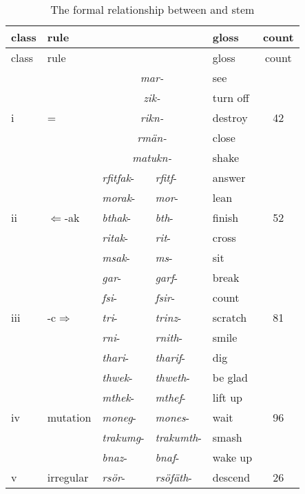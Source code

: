 \begin{table}
\caption{The formal relationship between \Ext{} and \Rs{} stem}
\begin{tabularx}{\textwidth}{lllllc}
\label{frbearr}\\
	\lsptoprule
	{class}&{rule} &\Ext{} &\Rs{} &{gloss} &{count}\\\midrule
	{class}&{rule} &\Ext{} &\Rs{} &{gloss} &{count}\\\midrule
	\multirow{5}{*}{{i}}	&\multirow{5}{*}{\Ext{}=\Rs{}} &\multicolumn{2}{c}{\emph{mar-}} &see &\multirow{5}{*}{\textsc{42}}\\
	&&\multicolumn{2}{c}{\emph{zik-}} &turn off &\\
	&&\multicolumn{2}{c}{\emph{rikn-}} &destroy &\\
	&&\multicolumn{2}{c}{\emph{rmän-}} &close &\\
	&&\multicolumn{2}{c}{\emph{matukn-}} &shake &\\\midrule
	\multirow{5}{*}{{ii}} &\multirow{5}{*}{\Ext{}$\Leftarrow$\Rs-ak} &\emph{rfitfak}- &\emph{rfitf}- &answer &\multirow{5}{*}{\textsc{52}}\\
	&&\emph{morak}- &\emph{mor}- &lean &\\
	&&\emph{bthak}- &\emph{bth}- &finish &\\
	&&\emph{ritak}-	&\emph{rit}- &cross &\\
	&&\emph{msak}- &\emph{ms}-	&sit &\\\midrule
	\multirow{5}{*}{{iii}} &\multirow{5}{*}{\Ext-{c}$\Rightarrow$\Rs} &\emph{gar}- &\emph{garf}- &break &\multirow{5}{*}{\textsc{81}}\\
	&&\emph{fsi}- &\emph{fsir}- &count &\\
	&&\emph{tri}- &\emph{trinz}- &scratch &\\
	&&\emph{rni}- &\emph{rnith}- &smile &\\
	&&\emph{thari}- &\emph{tharif}-	&dig &\\\midrule
	\multirow{5}{*}{{iv}} &\multirow{5}{*}{{mutation}} &\emph{thwek}- &\emph{thweth}- &be glad &\multirow{5}{*}{\textsc{96}}\\
	&&\emph{mthek}- &\emph{mthef}- &lift up &\\
	&&\emph{moneg}-	&\emph{mones}- &wait &\\
	&&\emph{trakumg}- &\emph{trakumth}- &smash &\\
	&&\emph{bnaz}- &\emph{bnaf}- &wake up\\\midrule
	\multirow{5}{*}{{v}}	&\multirow{5}{*}{{irregular}} &\emph{rsör}- &\emph{rsöfäth}- & descend &\multirow{5}{*}{\textsc{26}}\\

\end{tabularx}
\end{table}
